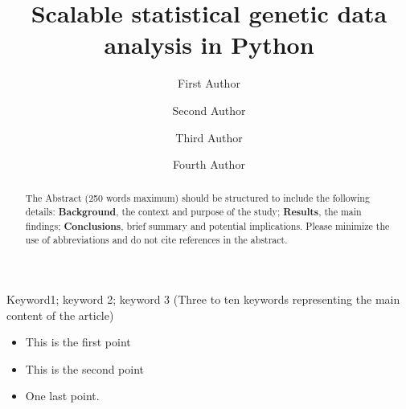\documentclass[a4paper,num-refs]{oup-contemporary}
\title{Scalable statistical genetic data analysis in Python}
\author[1,\authfn{1},\authfn{2}]{First Author}
\author[2,\authfn{1},\authfn{2}]{Second Author}
\author[2]{Third Author}
\author[2,\authfn{1}]{Fourth Author}
\affil[1]{First Institution}
\affil[2]{Second Institution}
\begin{document}
\begin{frontmatter}
\maketitle


\begin{abstract} The Abstract (250 words maximum) should be structured to
include the following details:
\textbf{Background}, the context and purpose of
the study;
\textbf{Results}, the main findings;
\textbf{Conclusions}, brief
summary and potential implications. Please minimize the use of abbreviations
and do not cite references in the abstract.
\end{abstract}

\begin{keywords}
Keyword1; keyword 2; keyword 3 (Three to ten keywords representing the main content of the article)
\end{keywords}
\end{frontmatter}

\begin{keypoints*}
\begin{itemize}
\item This is the first point
\item This is the second point
\item One last point.
\end{itemize}
\end{keypoints*}
\end{document}
